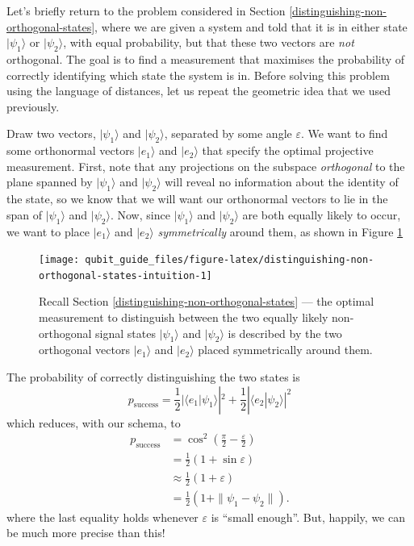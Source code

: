 \documentclass[fleqn,a4paper]{article}
\theoremstyle{definition}
\theoremstyle{definition}
\theoremstyle{definition}
\theoremstyle{definition}
\theoremstyle{remark}
\begin{document}
Let's briefly return to the problem considered in Section \ref{distinguishing-non-orthogonal-states}, where we are given a system and told that it is in either state \(|\psi_1\rangle\) or \(|\psi_2\rangle\), with equal probability, but that these two vectors are \emph{not} orthogonal.
The goal is to find a measurement that maximises the probability of correctly identifying which state the system is in.
Before solving this problem using the language of distances, let us repeat the geometric idea that we used previously.

Draw two vectors, \(|\psi_1\rangle\) and \(|\psi_2\rangle\), separated by some angle \(\varepsilon\).
We want to find some orthonormal vectors \(|e_1\rangle\) and \(|e_2\rangle\) that specify the optimal projective measurement.
First, note that any projections on the subspace \emph{orthogonal} to the plane spanned by \(|\psi_1\rangle\) and \(|\psi_2\rangle\) will reveal no information about the identity of the state, so we know that we will want our orthonormal vectors to lie in the span of \(|\psi_1\rangle\) and \(|\psi_2\rangle\).
Now, since \(|\psi_1\rangle\) and \(|\psi_2\rangle\) are both equally likely to occur, we want to place \(|e_1\rangle\) and \(|e_2\rangle\) \emph{symmetrically} around them, as shown in Figure \ref{fig:distinguishing-non-orthogonal-states-intuition}



\begin{figure}[H]

{\centering \texttt{[image: qubit\_guide\_files/figure-latex/distinguishing-non-orthogonal-states-intuition-1]} 

}

\caption{Recall Section \ref{distinguishing-non-orthogonal-states} --- the optimal measurement to distinguish between the two equally likely non-orthogonal signal states \(|\psi_1\rangle\) and \(|\psi_2\rangle\) is described by the two orthogonal vectors \(|e_1\rangle\) and \(|e_2\rangle\) placed symmetrically around them.}\label{fig:distinguishing-non-orthogonal-states-intuition}
\end{figure}

The probability of correctly distinguishing the two states is
\[
  p_{\mathrm{success}}
  = \frac{1}{2}|\langle e_1|\psi_1\rangle|^2 + \frac{1}{2}|\langle e_2|\psi_2\rangle|^2
\]
which reduces, with our schema, to
\[
  \begin{aligned}
    p_{\mathrm{success}}
    &= \cos^2\left(\frac{\pi}{2}-\frac{\varepsilon}{2}\right)
  \\&= \frac{1}{2}(1+\sin\varepsilon)
  \\&\approx \frac{1}{2}(1+\varepsilon)
  \\&= \frac{1}{2}(1+\|\psi_1-\psi_2\|).
  \end{aligned}
\]
where the last equality holds whenever \(\varepsilon\) is ``small enough''.
But, happily, we can be much more precise than this!
\end{document}
